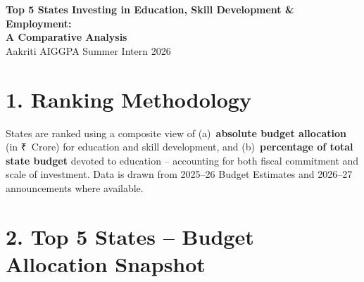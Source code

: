 \documentclass[11pt,a4paper]{article}
\newcommand{\rupee}{\textrm{\fontspec{Calibri}₹}}
\begin{document}
\onehalfspacing

\begin{center}
  {\fontsize{12}{14}\selectfont\bfseries\color{navyblue}
  Top 5 States Investing in Education, Skill Development \& Employment:\\[2pt]
  A Comparative Analysis}\\[6pt]
  {\small\color{darkgray} Aakriti \quad\textbar\quad AIGGPA Summer Intern 2026}
\end{center}

\vspace{0.2cm}

\section{1. Ranking Methodology}

States are ranked using a composite view of (a)~\textbf{absolute budget allocation} (in \rupee~Crore) for education and skill development, and (b)~\textbf{percentage of total state budget} devoted to education -- accounting for both fiscal commitment and scale of investment. Data is drawn from 2025--26 Budget Estimates and 2026--27 announcements where available.

\vspace{0.15cm}
\section{2. Top 5 States -- Budget Allocation Snapshot}
\end{document}
